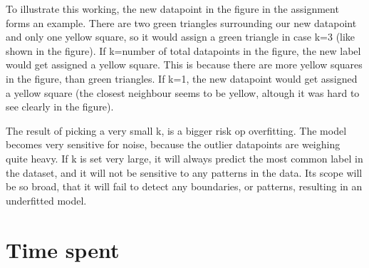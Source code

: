 \documentclass[11pt]{article}
\begin{document}
To illustrate this working, the new datapoint in the figure in the assignment forms an example.
There are two green triangles surrounding our new datapoint and only one yellow square, so it would assign a green triangle in case k=3 (like shown in the figure).
If k=number of total datapoints in the figure, the new label would get assigned a yellow square.
This is because there are more yellow squares in the figure, than green triangles.
If k=1, the new datapoint would get assigned a yellow square (the closest neighbour seems to be yellow, altough it was hard to see clearly in the figure).

The result of picking a very small k, is a bigger risk op overfitting. The model becomes very sensitive for noise, because the outlier datapoints are weighing quite heavy.
If k is set very large, it will always predict the most common label in the dataset, and it will not be sensitive to any patterns in the data.
Its scope will be so broad, that it will fail to detect any boundaries, or patterns, resulting in an underfitted model.


\clearpage
\onecolumn

\section*{Time spent}\label{app.time}
\end{document}

